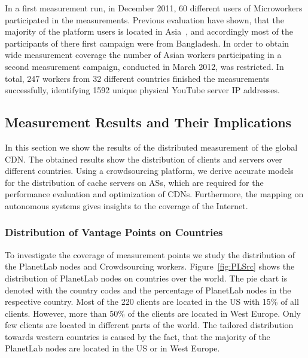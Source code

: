In a first measurement run, in December 2011, 60 different users of Microworkers participated in the measurements.
Previous evaluation have shown, that the majority of the platform users is located in Asia~\cite{conf2011-410}, and accordingly most of the participants of there first campaign were from Bangladesh.
In order to obtain wide measurement coverage the number of Asian workers participating in a second measurement campaign, conducted in March 2012, was restricted.
In total, 247 workers from 32 different countries finished the measurements successfully, identifying 1592 unique physical YouTube server IP addresses.

\subsection{Measurement Results and Their Implications}
\label{sec:crowd:results}

In this section we show the results of the distributed measurement of the global CDN.
The obtained results show the distribution of clients and servers over different countries.
Using a crowdsourcing platform, we derive accurate models for the distribution of cache servers on ASs, which are required for the performance evaluation and optimization of CDNs.
Furthermore, the mapping on autonomous systems gives insights to the coverage of the Internet.

\subsubsection{Distribution of Vantage Points on Countries}

To investigate the coverage of measurement points we study the distribution of the PlanetLab nodes and Crowdsourcing workers.
Figure~\ref{fig:PLSrc} shows the distribution of PlanetLab nodes on countries over the world.
The pie chart is denoted with the country codes and the percentage of PlanetLab nodes in the respective country.
Most of the 220 clients are located in the US with 15\% of all clients.
However, more than 50\% of the clients are located in West Europe.
Only few clients are located in different parts of the world.
The tailored distribution towards western countries is caused by the fact, that the majority of the PlanetLab nodes are located in the US or in West Europe.

